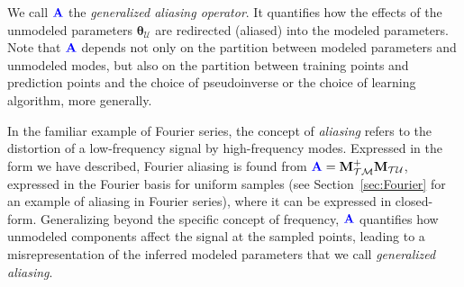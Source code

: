 \documentclass[twocolumn,aps,prx,superscriptaddress,10pt]{revtex4-2}
\newcommand{\0}{\bm{0}}
\newcommand{\btheta}{\boldsymbol{\theta}}
\newcommand{\M}{\mathcal{M}} %
\newcommand{\T}{\mathcal{T}} %
\newcommand{\U}{\mathcal{U}} %
\newcommand{\bbA}{{\color{blue}{\mathbf{A}}}}  %
\newcommand{\bbM}{\mathbf{M}}
\newcommand{\MTM}{\bbM_{\T\M}}
\newcommand{\MTU}{\bbM_{\T\U}}
\begin{document}
We call ${\bbA}$ the \emph{generalized aliasing operator}.  It quantifies how the effects of the unmodeled parameters $\btheta_\U$ are redirected (aliased) into the modeled parameters.
Note that ${\bbA}$ depends not only on the partition between modeled parameters and unmodeled modes, but also on the partition between training points and prediction points and the choice of pseudoinverse or the choice of learning algorithm, more generally.

In the familiar example of Fourier series, the concept of \emph{aliasing} refers to the distortion of a low-frequency signal by high-frequency modes.
Expressed in the form we have described, Fourier aliasing is found from $\bbA = \MTM^+ \MTU$, expressed in the Fourier basis for uniform samples (see Section~\ref{sec:Fourier} for an example of aliasing in Fourier series), where it can be expressed in closed-form.  
Generalizing beyond the specific concept of frequency, $\bbA$ quantifies how unmodeled components affect the signal at the sampled points, leading to a misrepresentation of the inferred modeled parameters that we call \emph{generalized aliasing}.
\end{document}
